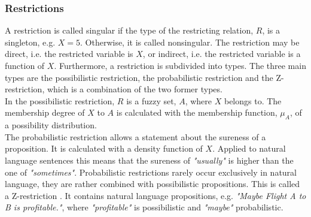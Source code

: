 \documentclass[conference]{IEEEtran}
\begin{document}
\subsubsection{Restrictions}
\label{subsubsec:restrictions}
A restriction is called singular if the type of the restricting relation, \begin{math} R \end{math}, is a singleton, e.g. \begin{math} X=5 \end{math}. Otherwise, it is called nonsingular. The restriction may be direct, i.e. the restricted variable is \begin{math} X \end{math}, or indirect, i.e. the restricted variable is a function of \begin{math} X \end{math}. Furthermore, a restriction is subdivided into types. The three main types are the possibilistic restriction, the probabilistic restriction and the Z-restriction, which is a combination of the two former types.\\
In the possibilistic restriction, \begin{math} R \end{math} is a fuzzy set, \begin{math} A \end{math}, where \begin{math} X \end{math} belongs to. The membership degree of \begin{math} X \end{math} to \begin{math} A \end{math} is calculated with the membership function, \begin{math} \mu_{A} \end{math}, of a possibility distribution.\\
The probabilistic restriction allows a statement about the sureness of a proposition. It is calculated with a density function of \begin{math} X \end{math}. Applied to natural language sentences this means that the sureness of \emph{"usually"} is higher than the one of \emph{"sometimes"}. Probabilistic restrictions rarely occur exclusively in natural language, they are rather combined with possibilistic propositions. This is called a Z-restriction \cite{zadeh2013}. It contains natural language propositions, e.g. \emph{"Maybe Flight A to B is profitable."}, where \emph{"profitable"} is possibilistic and \emph{"maybe"} probabilistic.\\
\end{document}
